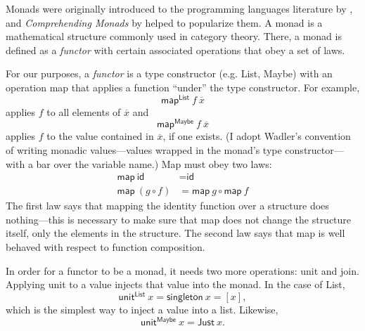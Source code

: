 \documentclass[acmsmall, nonacm, screen]{acmart}
\newcommand{\map}[3]{\textsf{map}^{\textsf{#1}}~#2~#3}
\newcommand{\unit}[2]{\textsf{unit}^{\textsf{#1}}~#2}
\begin{document}
Monads were originally introduced to the programming languages literature by
\citet{moggi1991notions}, and {\em Comprehending Monads} by \citet{wadler1990comprehending}
helped to popularize them. A monad is a mathematical structure commonly used in category theory.
There, a monad is defined as a {\em functor} with certain associated operations that obey a set
of laws.

For our purposes, a {\em functor} is a type constructor (e.g. \textsf{List}, \textsf{Maybe}) with
an operation \textsf{map} that applies a function ``under'' the type constructor. For example,
\[ \map{List}{f}{\overline{x}} \]
applies $f$ to all elements of $\overline{x}$ and 
\[ \map{Maybe}{f}{\overline{x}} \]
applies $f$ to the value contained in $\overline{x}$, if one exists. (I adopt Wadler's convention
of writing monadic values---values wrapped in the monad's type constructor---with a bar over the
variable name.) Map must obey two laws:
\begin{align*}
  \textsf{map}~\textsf{id} &= \textsf{id} \\
  \textsf{map}~(g \circ f) &= \textsf{map}~g \circ \textsf{map}~f
\end{align*}
The first law says that mapping the identity function over a structure does nothing---this is
necessary to make sure that \textsf{map} does not change the structure itself, only the elements
in the structure. The second law says that \textsf{map} is well behaved with respect to function
composition.

In order for a functor to be a monad, it needs two more operations: \textsf{unit} and \textsf{join}.
Applying \textsf{unit} to a value injects that value into the monad. In the case of \textsf{List},
\[ \unit{List}{x} = \textsf{singleton}~x = [x], \]
which is the simplest way to inject a value into a list. Likewise,
\[ \unit{Maybe}{x} = \textsf{Just}~x. \]
\end{document}
